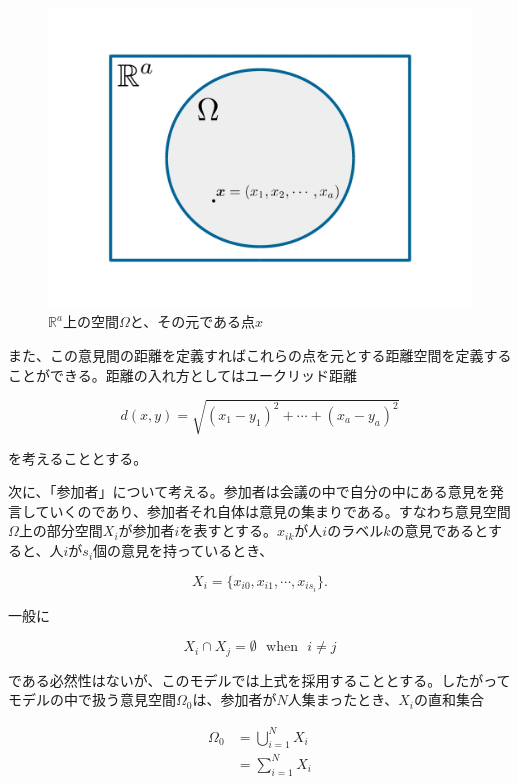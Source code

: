 \begin{figure}[H]
    \begin{center}
        \includegraphics[width=12.5cm]{../img/ideaspace.jpg}
        \caption{$\mathbb{R}^{a}$上の空間$\Omega$と、その元である点$x$}
        \label{fig:f1}
    \end{center}
\end{figure}

また、この意見間の距離を定義すればこれらの点を元とする距離空間を定義することができる。距離の入れ方としてはユークリッド距離

$$d(x, y) = \sqrt{(x_{1} - y_{1})^{2} + \cdots + (x_{a} - y_{a})^{2}}$$

を考えることとする。

次に、「参加者」について考える。参加者は会議の中で自分の中にある意見を発言していくのであり、参加者それ自体は意見の集まりである。すなわち意見空間$\Omega$上の部分空間$X_{i}$が参加者$i$を表すとする。$x_{ik}$が人$i$のラベル$k$の意見であるとすると、人$i$が$s_{i}$個の意見を持っているとき、

$$X_{i} = \{x_{i0}, x_{i1}, \cdots , x_{is_{i}}\}.$$

一般に

$$X_{i}\cap X_{j} = \emptyset\ \ \  \text{when}\ \ \ i \neq j$$

である必然性はないが、このモデルでは上式を採用することとする。したがってモデルの中で扱う意見空間$\Omega_{0}$は、参加者が$N$人集まったとき、$X_{i}$の直和集合

\begin{align}\Omega_{0} &= \bigcup_{i = 1}^{N} X_{i}\\
&= \sum_{i=1}^{N} X_{i} \end{align}

